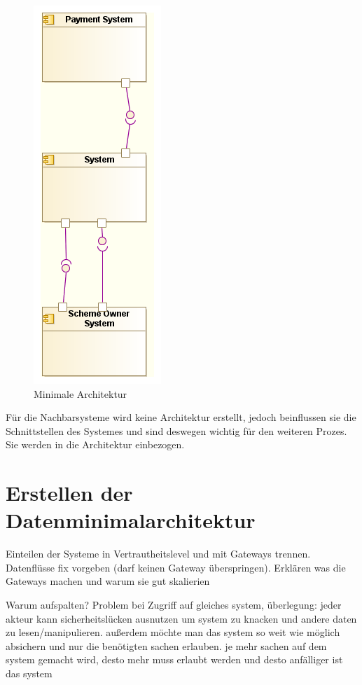 \begin{figure}[!htbp]
    \centering
    \includegraphics[scale=0.5]{uml/minimalarch.png}
    \caption{Minimale Architektur}
\end{figure}

Für die Nachbarsysteme wird keine Architektur erstellt, jedoch beinflussen sie die Schnittstellen des Systemes und sind deswegen wichtig für den weiteren Prozes. Sie werden in die Architektur einbezogen.

\section{Erstellen der Datenminimalarchitektur}
Einteilen der Systeme in Vertrautheitslevel und mit Gateways trennen. Datenflüsse fix vorgeben (darf keinen Gateway überspringen). Erklären was die Gateways machen und warum sie gut skalierien

Warum aufspalten? Problem bei Zugriff auf gleiches system, überlegung: jeder akteur kann sicherheitslücken ausnutzen um system zu knacken und andere daten zu lesen/manipulieren. außerdem möchte man das system so weit wie möglich absichern und nur die benötigten sachen erlauben. je mehr sachen auf dem system gemacht wird, desto mehr muss erlaubt werden und desto anfälliger ist das system

